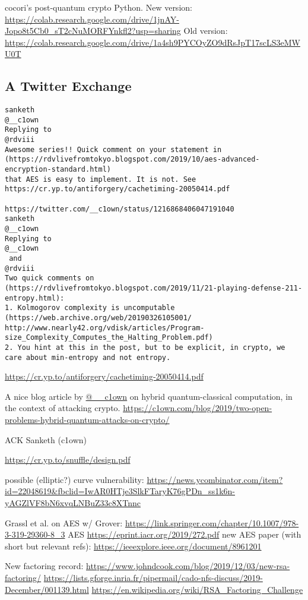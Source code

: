 \documentclass[%
 aip,
 jmp,%
 amsmath,amssymb,
 reprint,%
]{revtex4-1}
\begin{document}
cocori's post-quantum crypto Python.  New version:
\url{https://colab.research.google.com/drive/1jnAY-Jopo8t5Cb0_sT2cNuMORFYnkfl2?usp=sharing}
Old version:
\url{https://colab.research.google.com/drive/1a4sh9PYCOyZO9dRsJpT17scLS3eMWU0T}

\subsection{A Twitter Exchange}

\begin{verbatim}
sanketh
@__c1own
Replying to 
@rdviii
Awesome series!! Quick comment on your statement in
(https://rdvlivefromtokyo.blogspot.com/2019/10/aes-advanced-encryption-standard.html)
that AES is easy to implement. It is not. See
https://cr.yp.to/antiforgery/cachetiming-20050414.pdf

https://twitter.com/__c1own/status/1216868406047191040
sanketh
@__c1own
Replying to 
@__c1own
 and 
@rdviii
Two quick comments on (https://rdvlivefromtokyo.blogspot.com/2019/11/21-playing-defense-211-entropy.html):
1. Kolmogorov complexity is uncomputable (https://web.archive.org/web/20190326105001/ http://www.nearly42.org/vdisk/articles/Program-size_Complexity_Computes_the_Halting_Problem.pdf)
2. You hint at this in the post, but to be explicit, in crypto, we
care about min-entropy and not entropy.
\end{verbatim}

\url{https://cr.yp.to/antiforgery/cachetiming-20050414.pdf}

A nice blog article by \url{@__c1own} on hybrid quantum-classical computation, in the context of attacking crypto.
\url{https://c1own.com/blog/2019/two-open-problems-hybrid-quantum-attacks-on-crypto/}

ACK Sanketh (c1own)

\url{https://cr.yp.to/snuffle/design.pdf}

possible (elliptic?) curve vulnerability:
\url{https://news.ycombinator.com/item?id=22048619&fbclid=IwAR0HTje3SlkFTaryK76gPDn_ss1k6n-yAGZlVF8bN6xvqLNBuZ33c8XTnnc}

Grassl et al. on AES w/ Grover:
\url{https://link.springer.com/chapter/10.1007/978-3-319-29360-8_3}
AES
\url{https://eprint.iacr.org/2019/272.pdf}
new AES paper (with short but relevant refs):
\url{https://ieeexplore.ieee.org/document/8961201}

New factoring record:
\url{https://www.johndcook.com/blog/2019/12/03/new-rsa-factoring/}
\url{https://lists.gforge.inria.fr/pipermail/cado-nfs-discuss/2019-December/001139.html}
\url{https://en.wikipedia.org/wiki/RSA_Factoring_Challenge}
\end{document}
